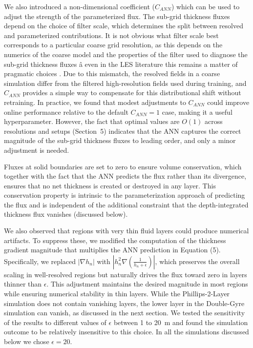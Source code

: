 \documentclass[draft]{agujournal2019}
\begin{document}
We also introduced a non-dimensional coefficient ($C_{ANN}$) which can be used to adjust the strength of the parameterized flux. The sub-grid thickness fluxes depend on the choice of filter scale, which determines the split between resolved and parameterized contributions. It is not obvious what filter scale best corresponds to a particular coarse grid resolution, as this depends on the numerics of the coarse model and the properties of the filter used to diagnose the sub-grid thickness fluxes â even in the LES literature this remains a matter of pragmatic choices \cite{lund2003use}. Due to this mismatch, the resolved fields in a coarse simulation differ from the filtered high-resolution fields used during training, and $C_{ANN}$ provides a simple way to compensate for this distributional shift without retraining. In practice, we found that modest adjustments to $C_{ANN}$ could improve online performance relative to the default $C_{ANN}=1$ case, making it a useful hyperparameter. However, the fact that optimal values are $O(1)$ across resolutions and setups (Section~5) indicates that the ANN captures the correct magnitude of the sub-grid thickness fluxes to leading order, and only a minor adjustment is needed.

Fluxes at solid boundaries are set to zero to ensure volume conservation, which together with the fact that the ANN predicts the flux rather than its divergence, ensures that no net thickness is created or destroyed in any layer. This conservation property is intrinsic to the parameterization approach of predicting the flux and is independent of the additional constraint that the depth-integrated thickness flux vanishes (discussed below).

We also observed that regions with very thin fluid layers could produce numerical artifacts. To suppress these, we modified the computation of the thickness gradient magnitude that multiplies the ANN prediction in Equation (5). Specifically, we replaced $|\nabla h_n|$ with $\left|h_n^2 \nabla\left(\frac{1}{h_n + \epsilon}\right)\right|$, which preserves the overall scaling in well-resolved regions but naturally drives the flux toward zero in layers thinner than $\epsilon$. This adjustment maintains the desired magnitude in most regions while ensuring numerical stability in thin layers.
While the Phillips-2-Layer simulation does not contain vanishing layers, the lower layer in the Double-Gyre simulation can vanish, as discussed in the next section. We tested the sensitivity of the results to different values of $\epsilon$ between 1 to 20~m and found the simulation outcome to be relatively insensitive to this choice. In all the simulations discussed below we chose $\epsilon=20$.
\end{document}
